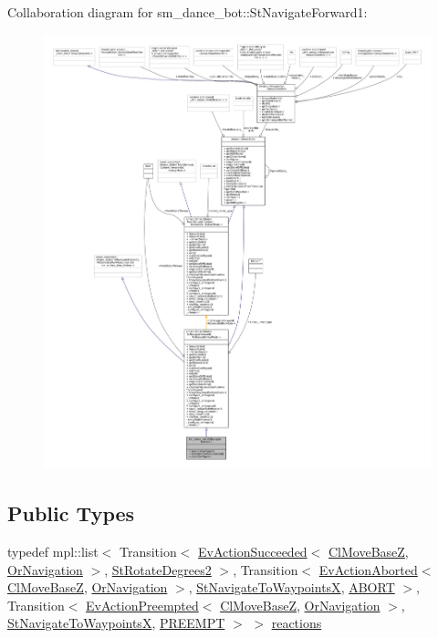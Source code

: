Collaboration diagram for sm\+\_\+dance\+\_\+bot\+:\+:St\+Navigate\+Forward1\+:
\nopagebreak
\begin{figure}[H]
\begin{center}
\leavevmode
\includegraphics[width=350pt]{structsm__dance__bot_1_1StNavigateForward1__coll__graph}
\end{center}
\end{figure}
\subsection*{Public Types}
\begin{DoxyCompactItemize}
\item 
typedef mpl\+::list$<$ Transition$<$ \hyperlink{structsmacc_1_1default__events_1_1EvActionSucceeded}{Ev\+Action\+Succeeded}$<$ \hyperlink{classcl__move__base__z_1_1ClMoveBaseZ}{Cl\+Move\+BaseZ}, \hyperlink{classsm__dance__bot_1_1OrNavigation}{Or\+Navigation} $>$, \hyperlink{structsm__dance__bot_1_1StRotateDegrees2}{St\+Rotate\+Degrees2} $>$, Transition$<$ \hyperlink{structsmacc_1_1default__events_1_1EvActionAborted}{Ev\+Action\+Aborted}$<$ \hyperlink{classcl__move__base__z_1_1ClMoveBaseZ}{Cl\+Move\+BaseZ}, \hyperlink{classsm__dance__bot_1_1OrNavigation}{Or\+Navigation} $>$, \hyperlink{structsm__dance__bot_1_1StNavigateToWaypointsX}{St\+Navigate\+To\+WaypointsX}, \hyperlink{structsmacc_1_1default__transition__tags_1_1ABORT}{A\+B\+O\+RT} $>$, Transition$<$ \hyperlink{structsmacc_1_1default__events_1_1EvActionPreempted}{Ev\+Action\+Preempted}$<$ \hyperlink{classcl__move__base__z_1_1ClMoveBaseZ}{Cl\+Move\+BaseZ}, \hyperlink{classsm__dance__bot_1_1OrNavigation}{Or\+Navigation} $>$, \hyperlink{structsm__dance__bot_1_1StNavigateToWaypointsX}{St\+Navigate\+To\+WaypointsX}, \hyperlink{structsmacc_1_1default__transition__tags_1_1PREEMPT}{P\+R\+E\+E\+M\+PT} $>$ $>$ \hyperlink{structsm__dance__bot_1_1StNavigateForward1_a4a49d0c774d44f96b17ceac4c6628104}{reactions}
\end{DoxyCompactItemize}

